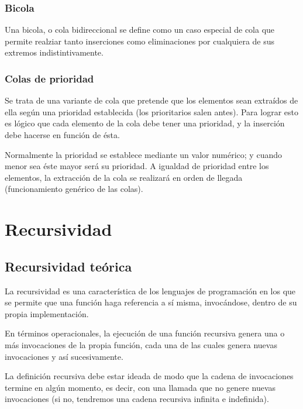 \documentclass[a4paper, 11pt, titlepage]{article}
\begin{document}
        \subsubsection{Bicola}

            Una bicola, o cola bidireccional se define como un caso especial de cola que permite 
            realziar tanto inserciones como eliminaciones por cualquiera de sus extremos indistintivamente.

        \subsubsection{Colas de prioridad}

            Se trata de una variante de cola que pretende que los elementos sean extraídos de ella según 
            una prioridad establecida (los prioritarios salen antes). Para lograr esto es lógico que cada 
            elemento de la cola debe tener una prioridad, y la inserción debe hacerse en función de ésta.

            Normalmente la prioridad se establece mediante un valor numérico; y cuando menor sea éste 
            mayor será su prioridad. A igualdad de prioridad entre los elementos, la extracción de la cola 
            se realizará en orden de llegada (funcionamiento genérico de las colas).

\section{Recursividad}

    \subsection{Recursividad teórica}

        La recursividad es una característica de los lenguajes de programación en los que se permite 
        que una función haga referencia a sí misma, invocándose, dentro de su propia implementación.

        En términos operacionales, la ejecución de una función recursiva genera una o más invocaciones 
        de la propia función, cada una de las cuales genera nuevas invocaciones y así sucesivamente.

        La definición recursiva debe estar ideada de modo que la cadena de invocaciones termine 
        en algún momento, es decir, con una llamada que no genere nuevas invocaciones (si no, tendremos 
        una cadena recursiva infinita e indefinida).
    
\end{document}
